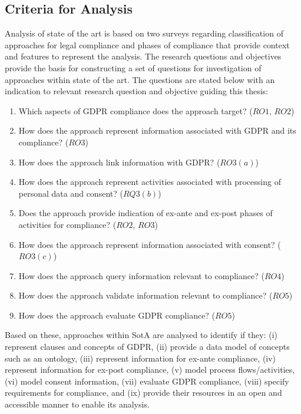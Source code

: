 \subsection{Criteria for Analysis}
Analysis of state of the art is based on two surveys regarding
classification of approaches for legal compliance \cite{otto_addressing_2007} and phases of compliance \cite{fellmann_state---art_2014} that provide context and features to represent the analysis.
The research questions and objectives provide the basis for constructing a set of questions for investigation of approaches within state of the art.
The questions are stated below with an indication to relevant research question and objective guiding this thesis:
\begin{enumerate}
    \item Which aspects of GDPR compliance does the approach target? ($RO1$, $RO2$)
    \item How does the approach represent information associated with GDPR and its compliance? ($RO3$)
    \item How does the approach link information with GDPR? ($RO3(a)$)
    \item How does the approach represent activities associated with processing of personal data and consent? ($RQ3(b)$)
    \item Does the approach provide indication of ex-ante and ex-post phases of activities for compliance? ($RO2$, $RO3$)
    \item How does the approach represent information associated with consent? ($RO3(c)$)
    \item How does the approach query information relevant to compliance? ($RO4$)
    \item How does the approach validate information relevant to compliance? ($RO5$)
    \item How does the approach evaluate GDPR compliance? ($RO5$)
\end{enumerate}

Based on these, approaches within SotA are analysed to identify if they: (i) represent clauses and concepts of GDPR, (ii) provide a data model of concepts such as an ontology, (iii) represent information for ex-ante compliance, (iv) represent information for ex-post compliance, (v) model process flows/activities, (vi) model consent information, (vii) evaluate GDPR compliance, (viii) specify requirements for compliance, and (ix) provide their resources in an open and accessible manner to enable its analysis.

